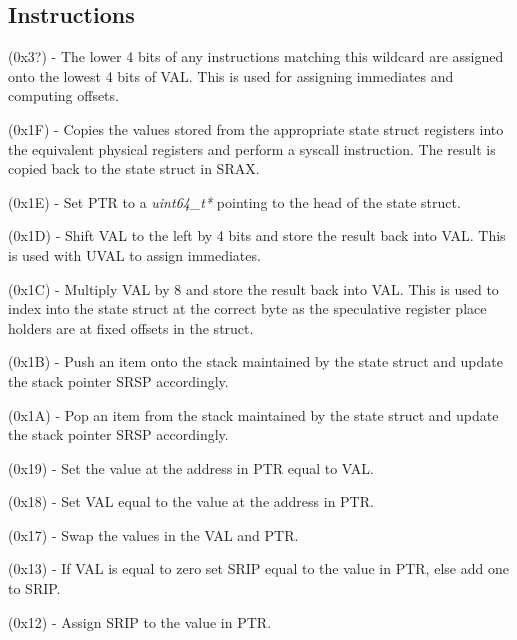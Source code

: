 \subsection{Instructions}
\begin{description}
  \setlength\itemsep{1em}
\item[UVAL] (0x3?) - 
The lower 4 bits of any instructions matching this wildcard are 
assigned onto the lowest 4 bits of VAL. This is used
for assigning immediates and computing offsets.
  
\item[SYSCALL] (0x1F) - 
Copies the values stored from the appropriate state struct registers 
into the equivalent physical registers and perform a syscall instruction. 
The result is copied back to the state struct in SRAX.

\item[BASE] (0x1E) - 
Set PTR to a \textit{uint64\_t*} pointing to the head of the state struct.  

\item[SHVAL] (0x1D) - 
Shift VAL to the left by 4 bits and store the result back into VAL. This is
used with UVAL to assign immediates.

\item[MREG] (0x1C) - 
Multiply VAL by 8 and store the result back into VAL. This is used to index 
into the state struct at the correct byte as the speculative register place
holders are at fixed offsets in the struct.

\item[PUSH] (0x1B) -
Push an item onto the stack maintained by the state struct and update the 
stack pointer SRSP accordingly. 
 
\item[POP] (0x1A) - 
Pop an item from the stack maintained by the state struct and update the 
stack pointer SRSP accordingly. 

\item[APTR] (0x19) - 
Set the value at the address in PTR equal to VAL.

\item[DPTR] (0x18) - 
Set VAL equal to the value at the address in PTR. 

\item[SWAP] (0x17) - 
Swap the values in the VAL and PTR.

\item[JZ] (0x13) - 
If VAL is equal to zero set SRIP equal to the value in PTR, else add one to SRIP.

\item[J] (0x12) - 
Assign SRIP to the value in PTR.


\end{description}
